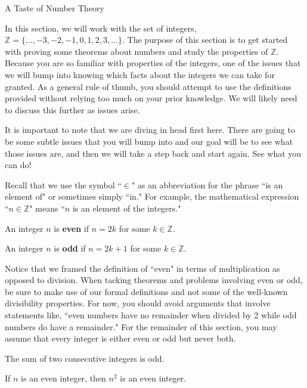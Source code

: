\begin{section}{A Taste of Number Theory}

In this section, we will work with the set of integers, $\mathbb{Z} = \{\ldots, -3, -2, -1, 0, 1, 2, 3, \ldots\}$.  The purpose of this section is to get started with proving some theorems about numbers and study the properties of $\mathbb{Z}$. Because you are so familiar with properties of the integers, one of the issues that we will bump into knowing which facts about the integers we can take for granted.  As a general rule of thumb, you should attempt to use the definitions provided without relying too much on your prior knowledge.  We will likely need to discuss this further as issues arise.

It is important to note that we are diving in head first here.  There are going to be some subtle issues that you will bump into and our goal will be to see what those issues are, and then we will take a step back and start again.  See what you can do!

Recall that we use the symbol ``$\in$" as an abbreviation for the phrase ``is an element of" or sometimes simply ``in."  For example, the mathematical expression ``$n\in\mathbb{Z}$" means ``$n$ is an element of the integers."

\begin{definition}
An integer $n$ is \textbf{even} if $n=2k$ for some $k\in\mathbb{Z}$.
\end{definition}

\begin{definition}
An integer $n$ is \textbf{odd} if $n=2k+1$ for some $k\in\mathbb{Z}$.
\end{definition}

Notice that we framed the definition of ``even" in terms of multiplication as opposed to division. When tacking theorems and problems involving even or odd, be sure to make use of our formal definitions and not some of the well-known divisibility properties.  For now, you should avoid arguments that involve statements like, ``even numbers have no remainder when divided by 2 while odd numbers do have a remainder." For the remainder of this section, you may assume that every integer is either even or odd but never both.

\begin{theorem}\label{two consecutive ints}
The sum of two consecutive integers is odd.
\end{theorem}

\begin{theorem}\label{thm:n even implies n^2 even}
If $n$ is an even integer, then $n^2$ is an even integer.
\end{theorem}


\end{section}
